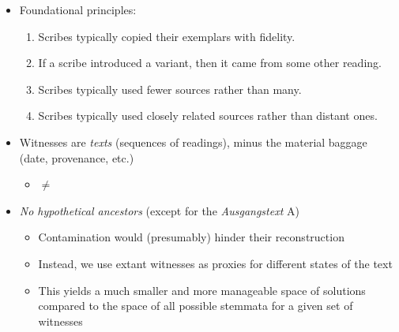 \documentclass[10pt]{beamer}
\begin{document}
	\begin{frame}
		\begin{itemize}
			\item Foundational principles:
			\begin{enumerate}
				\item Scribes typically copied their exemplars with fidelity.
				\item If a scribe introduced a variant, then it came from some other reading.
				\item Scribes typically used fewer sources rather than many.
				\item Scribes typically used closely related sources rather than distant ones.
			\end{enumerate}
			\item Witnesses are \emph{texts} (sequences of readings), minus the material baggage (date, provenance, etc.)
			\begin{itemize}
				\item {} $\neq$ 
			\end{itemize}
			\item \emph{No hypothetical ancestors} (except for the \emph{Ausgangstext} A)
			\begin{itemize}
				\item Contamination would (presumably) hinder their reconstruction
				\item Instead, we use extant witnesses as proxies for different states of the text
				\item This yields a much smaller and more manageable space of solutions compared to the space of all possible stemmata for a given set of witnesses
			\end{itemize}
		\end{itemize}
	\end{frame}
\end{document}
